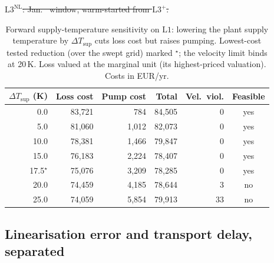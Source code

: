 \documentclass[a4paper,fleqn]{cas-sc} %
\newcommand{\Lone}{\ensuremath{\mathrm{L1}}}    %
\providecommand{\DIFdel}[1]{{\protect\color{red}\sout{#1}}} %
\providecommand{\DIFaddbegin}{} %
\providecommand{\DIFaddend}{} %
\providecommand{\DIFdelbegin}{} %
\providecommand{\DIFdelend}{} %
\providecommand{\DIFdelFL}[1]{\DIFdel{#1}} %
\providecommand{\DIFaddbeginFL}{} %
\providecommand{\DIFaddendFL}{} %
\providecommand{\DIFdelendFL}{} %
\providecommand{\Lplus}{\ensuremath{\mathrm{L3^{+}}}}
\providecommand{\Lnl}{\ensuremath{\mathrm{L3^{\mathrm{NL}}}}}
\begin{document}
\begin{table}[t]
\DIFdelFL{$\Lnl$: Jan. \ window, warm-started from $\Lplus$.
}%
\DIFdelendFL \DIFaddbeginFL \caption{Forward supply-temperature sensitivity on $\Lone$: lowering the plant supply
temperature by $\Delta T_\text{sup}$ cuts loss cost but raises pumping. Lowest-cost tested
reduction (over the swept grid) marked $^{\star}$; the velocity limit binds at 20\,K. Loss valued at the
marginal unit (its highest-priced valuation). Costs in EUR/yr.}
\label{tab:tsup}
\begin{tabular}{rrrrrc}
\hline
$\Delta T_\text{sup}$ (K) & Loss cost & Pump cost & Total & Vel.\ viol. & Feasible \\
\hline
0.0 & 83,721 & 784 & 84,505 & 0 & yes \\
5.0 & 81,060 & 1,012 & 82,073 & 0 & yes \\
10.0 & 78,381 & 1,466 & 79,847 & 0 & yes \\
15.0 & 76,183 & 2,224 & 78,407 & 0 & yes \\
17.5$^{\star}$ & 75,076 & 3,209 & 78,285 & 0 & yes \\
20.0 & 74,459 & 4,185 & 78,644 & 3 & no \\
25.0 & 74,059 & 5,854 & 79,913 & 33 & no \\
\hline
\end{tabular}
\DIFaddendFL \end{table}

\DIFdelbegin %
\DIFdelend \DIFaddbegin \subsection{Linearisation error and transport delay, separated}
\label{subsec:linearisation}
\DIFaddend 
\end{document}
